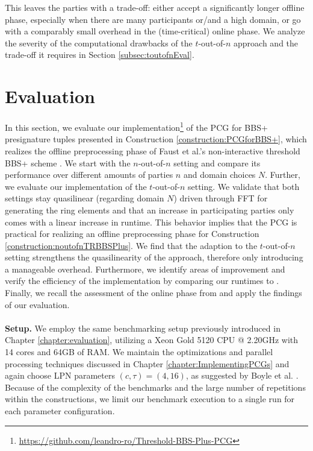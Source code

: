 This leaves the parties with a trade-off: either accept a significantly longer offline phase, especially when there are many participants or/and a high domain, or go with a comparably small overhead in the (time-critical) online phase. We analyze the severity of the computational drawbacks of the $t$-out-of-$n$ approach and the trade-off it requires in Section \ref{subsec:toutofnEval}.

\section{Evaluation}
\label{sec:evalBBSPlusPCG}
In this section, we evaluate our implementation\footnote{\url{https://github.com/leandro-ro/Threshold-BBS-Plus-PCG}} of the PCG for BBS+ presignature tuples presented in Construction \ref{construction:PCGforBBS+}, which realizes the offline preprocessing phase of Faust et al.'s non-interactive threshold BBS+ scheme \cite{faust2023non}. We start with the $n$-out-of-$n$ setting and compare its performance over different amounts of parties $n$ and domain choices $N$. Further, we evaluate our implementation of the $t$-out-of-$n$ setting. We validate that both settings stay quasilinear (regarding domain $N$) driven through FFT for generating the ring elements and that an increase in participating parties only comes with a linear increase in runtime. This behavior implies that the PCG is practical for realizing an offline preprocessing phase for Construction \ref{construction:noutofnTRBBSPlus}. We find that the adaption to the $t$-out-of-$n$ setting strengthens the quasilinearity of the approach, therefore only introducing a manageable overhead. Furthermore, we identify areas of improvement and verify the efficiency of the implementation by comparing our runtimes to \cite{abram2022low}. Finally, we recall the assessment of the online phase from \cite{faust2023non} and apply the findings of our evaluation.
\\\\
\textbf{Setup.} We employ the same benchmarking setup previously introduced in Chapter \ref{chapter:evaluation}, utilizing a Xeon Gold 5120 CPU @ 2.20GHz with 14 cores and 64GB of RAM. We maintain the optimizations and parallel processing techniques discussed in Chapter \ref{chapter:ImplementingPCGs} and again choose LPN parameters $(c,\tau)=(4,16)$, as suggested by Boyle et al. \cite{boyle2020efficient}. Because of the complexity of the benchmarks and the large number of repetitions within the constructions, we limit our benchmark execution to a single run for each parameter configuration.

